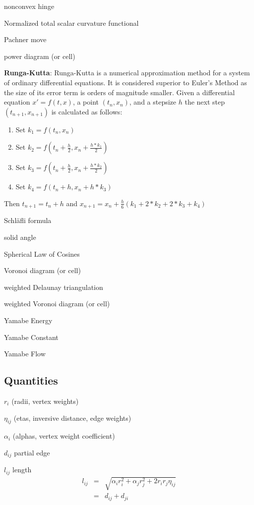 \documentclass{article}
\begin{document}
nonconvex hinge

Normalized total scalar curvature functional

Pachner move

power diagram (or cell)

\hangindent=1.0cm \textbf{Runga-Kutta}: Runga-Kutta is a numerical approximation method for a system of ordinary differential equations. It is considered superior to Euler's Method as the size of its error term is orders of magnitude smaller. Given a differential equation $x' = f(t, x)$, a point $(t_n, x_n)$, and a stepsize $h$ the next step $(t_{n+1}, x_{n+1})$ is calculated as follows:

	\begin{enumerate}
		\item Set $k_1 = f(t_n, x_n)$
		\item Set $k_2 = f(t_n + \frac{h}{2}, x_n + \frac{h*k_1}{2})$
		\item Set $k_3 = f(t_n + \frac{h}{2}, x_n + \frac{h*k_2}{2})$
		\item Set $k_4 = f(t_n + h, x_n + h*k_3)$
	\end{enumerate}
 \hangindent=1.0cm \noindent Then $t_{n+1} = t_n + h$ and $x_{n+1} = x_n + \frac{h}{6}(k_1 + 2*k_2 + 2*k_3 + k_4)$
\newline

Schl\"{a}fli formula

solid angle

Spherical Law of Cosines

Voronoi diagram (or cell)

weighted Delaunay triangulation

weighted Voronoi diagram (or cell)

Yamabe Energy

Yamabe Constant

Yamabe Flow

\bigskip 

\subsection{Quantities}

$r_{i}$ (radii, vertex weights)

$\eta _{ij}$ (etas, inversive distance, edge weights)

$\alpha _{i}$ (alphas, vertex weight coefficient)

$d_{ij}$ partial edge

$l_{ij}$ length%
\begin{eqnarray*}
l_{ij} &=&\sqrt{\alpha _{i}r_{i}^{2}+\alpha _{j}r_{j}^{2}+2r_{i}r_{j}\eta
_{ij}} \\
&=&d_{ij}+d_{ji}
\end{eqnarray*}
\end{document}
